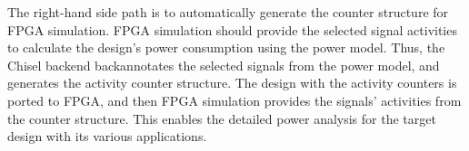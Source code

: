The right-hand side path is to automatically generate the counter structure for FPGA simulation.
FPGA simulation should provide the selected signal activities to calculate the design's power consumption using the power model.
Thus, the Chisel backend backannotates the selected signals from the power model, and generates the activity counter structure.
The design with the activity counters is ported to FPGA, and then FPGA simulation provides the signals' activities from the counter structure.
This enables the detailed power analysis for the target design with its various applications.